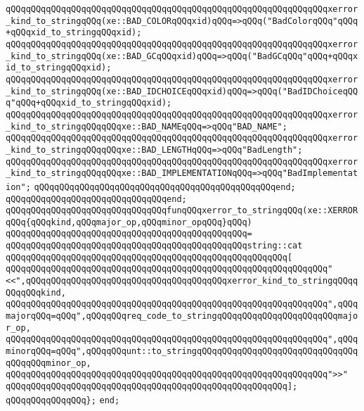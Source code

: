 \verb|qQQqqQQqqQQqqQQqqQQqqQQqqQQqqQQqqQQqqQQqqQQqqQQqqQQqqQQqqQQqqQQqxerror_kind_to_stringqQQq(xe::BAD_COLORqQQqxid)qQQq=>qQQq("BadColorqQQq"qQQq+qQQqxid_to_stringqQQqxid);|\newline
\verb|qQQqqQQqqQQqqQQqqQQqqQQqqQQqqQQqqQQqqQQqqQQqqQQqqQQqqQQqqQQqqQQqxerror_kind_to_stringqQQq(xe::BAD_GCqQQqxid)qQQq=>qQQq("BadGCqQQq"qQQq+qQQqxid_to_stringqQQqxid);|\newline
\verb|qQQqqQQqqQQqqQQqqQQqqQQqqQQqqQQqqQQqqQQqqQQqqQQqqQQqqQQqqQQqqQQqxerror_kind_to_stringqQQq(xe::BAD_IDCHOICEqQQqxid)qQQq=>qQQq("BadIDChoiceqQQq"qQQq+qQQqxid_to_stringqQQqxid);|\newline
\verb|qQQqqQQqqQQqqQQqqQQqqQQqqQQqqQQqqQQqqQQqqQQqqQQqqQQqqQQqqQQqqQQqxerror_kind_to_stringqQQqqQQqxe::BAD_NAMEqQQq=>qQQq"BAD_NAME";|\newline
\verb|qQQqqQQqqQQqqQQqqQQqqQQqqQQqqQQqqQQqqQQqqQQqqQQqqQQqqQQqqQQqqQQqxerror_kind_to_stringqQQqqQQqxe::BAD_LENGTHqQQq=>qQQq"BadLength";|\newline
\verb|qQQqqQQqqQQqqQQqqQQqqQQqqQQqqQQqqQQqqQQqqQQqqQQqqQQqqQQqqQQqqQQqxerror_kind_to_stringqQQqqQQqxe::BAD_IMPLEMENTATIONqQQq=>qQQq"BadImplementation";|\newline
\verb|qQQqqQQqqQQqqQQqqQQqqQQqqQQqqQQqqQQqqQQqqQQqqQQqend;|\newline
\newline
\verb|qQQqqQQqqQQqqQQqqQQqqQQqqQQqqQQqend;|\newline
\newline
\verb|qQQqqQQqqQQqqQQqqQQqqQQqqQQqqQQqfunqQQqxerror_to_stringqQQq(xe::XERRORqQQq{qQQqkind,qQQqmajor_op,qQQqminor_opqQQq}qQQq)|\newline
\verb|qQQqqQQqqQQqqQQqqQQqqQQqqQQqqQQqqQQqqQQqqQQqqQQq=|\newline
\verb|qQQqqQQqqQQqqQQqqQQqqQQqqQQqqQQqqQQqqQQqqQQqqQQqstring::cat|\newline
\verb|qQQqqQQqqQQqqQQqqQQqqQQqqQQqqQQqqQQqqQQqqQQqqQQqqQQqqQQq[|\newline
\verb|qQQqqQQqqQQqqQQqqQQqqQQqqQQqqQQqqQQqqQQqqQQqqQQqqQQqqQQqqQQqqQQq"<<",qQQqqQQqqQQqqQQqqQQqqQQqqQQqqQQqqQQqqQQqxerror_kind_to_stringqQQqqQQqqQQqkind,|\newline
\verb|qQQqqQQqqQQqqQQqqQQqqQQqqQQqqQQqqQQqqQQqqQQqqQQqqQQqqQQqqQQqqQQq",qQQqmajorqQQq=qQQq",qQQqqQQqreq_code_to_stringqQQqqQQqqQQqqQQqqQQqqQQqmajor_op,|\newline
\verb|qQQqqQQqqQQqqQQqqQQqqQQqqQQqqQQqqQQqqQQqqQQqqQQqqQQqqQQqqQQqqQQq",qQQqminorqQQq=qQQq",qQQqqQQqunt::to_stringqQQqqQQqqQQqqQQqqQQqqQQqqQQqqQQqqQQqqQQqminor_op,|\newline
\verb|qQQqqQQqqQQqqQQqqQQqqQQqqQQqqQQqqQQqqQQqqQQqqQQqqQQqqQQqqQQqqQQq">>"|\newline
\verb|qQQqqQQqqQQqqQQqqQQqqQQqqQQqqQQqqQQqqQQqqQQqqQQqqQQqqQQq];|\newline
\newline
\newline
\verb|qQQqqQQqqQQqqQQq};|\newline
\verb|end;|\newline
\newline

